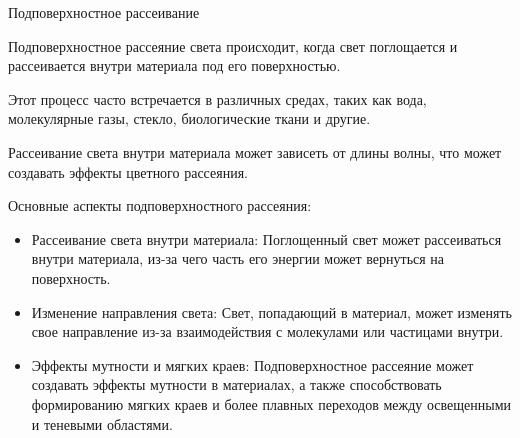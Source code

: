 \documentclass{beamer}
\begin{document}
	\begin{frame}{Подповерхностное рассеивание}

		Подповерхностное рассеяние света происходит, когда свет поглощается и рассеивается внутри материала под его поверхностью. 
		
		Этот процесс часто встречается в различных средах, таких как вода, молекулярные газы, стекло, биологические ткани и другие.
		
    Рассеивание света внутри материала может зависеть от длины волны, что может создавать эффекты цветного рассеяния.

		Основные аспекты подповерхностного рассеяния:
		{\footnotesize
		\begin{itemize}
			\item 
			Рассеивание света внутри материала: Поглощенный свет может рассеиваться внутри материала, из-за чего часть его энергии может вернуться на поверхность.
			\item 
			Изменение направления света: Свет, попадающий в материал, может изменять свое направление из-за взаимодействия с молекулами или частицами внутри.
			\item 
			Эффекты мутности и мягких краев: Подповерхностное рассеяние может создавать эффекты мутности в материалах, а также способствовать формированию мягких краев и более плавных переходов между освещенными и теневыми областями.
		\end{itemize}
		}
		

	\end{frame}
\end{document}
